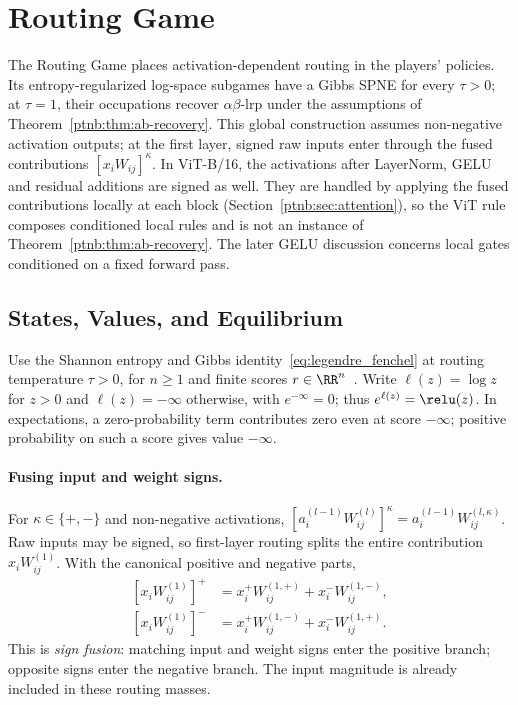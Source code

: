 \section{Routing Game}\label{ptnb:sec:routing}\label{subsec:routing_game_def}\label{ptnb:app:routing-formal}

The Routing Game places activation-dependent routing in the players' policies. Its entropy-regularized log-space subgames have a Gibbs SPNE for every $\tau>0$; at $\tau=1$, their occupations recover $\alpha\beta$-\ac{lrp} under the assumptions of Theorem~\ref{ptnb:thm:ab-recovery}. This global construction assumes non-negative activation outputs; at the first layer, signed raw inputs enter through the fused contributions $[x_iW_{ij}]^\kappa$. In ViT-B/16, the activations after LayerNorm, GELU and residual additions are signed as well. They are handled by applying the fused contributions locally at each block (Section~\ref{ptnb:sec:attention}), so the ViT rule composes conditioned local rules and is not an instance of Theorem~\ref{ptnb:thm:ab-recovery}. The later GELU discussion concerns local gates conditioned on a fixed forward pass.

\subsection{States, Values, and Equilibrium}\label{ptnb:app:routing-kernel}

Use the Shannon entropy and Gibbs identity~\eqref{eq:legendre_fenchel} at routing temperature $\tau>0$,
for $n\geq1$ and finite scores $r\in\RR^n$~\parencite{Geist2019regularized}.
Write $\ell(z)=\log z$ for $z>0$ and $\ell(z)=-\infty$ otherwise, with $e^{-\infty}=0$; thus $e^{\ell(z)}=\relu(z)$. In expectations, a zero-probability term contributes zero even at score $-\infty$; positive probability on such a score gives value $-\infty$.

\paragraph{Fusing input and weight signs.}
For $\kappa\in\{+,-\}$ and non-negative activations, $[a_i^{(l-1)}W_{ij}^{(l)}]^\kappa=a_i^{(l-1)}W_{ij}^{(l,\kappa)}$. Raw inputs may be signed, so first-layer routing splits the entire contribution $x_iW_{ij}^{(1)}$. With the canonical positive and negative parts,
\[
\begin{aligned}
 [x_iW_{ij}^{(1)}]^+&=x_i^+W_{ij}^{(1,+)}+x_i^-W_{ij}^{(1,-)},\\
 [x_iW_{ij}^{(1)}]^-&=x_i^+W_{ij}^{(1,-)}+x_i^-W_{ij}^{(1,+)}.
\end{aligned}
\]
This is \emph{sign fusion}: matching input and weight signs enter the positive branch; opposite signs enter the negative branch. The input magnitude is already included in these routing masses.

